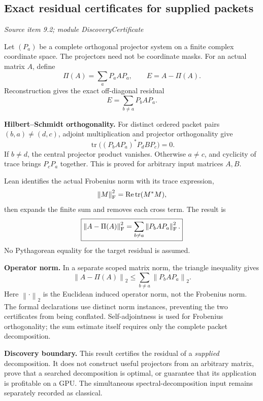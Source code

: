 \documentclass[11pt,letterpaper]{article}
\theoremstyle{definition}
\theoremstyle{remark}
\newcommand{\norm}[1]{\left\lVert#1\right\rVert}\newcommand{\abs}[1]{\left\lvert#1\right\rvert}
\begin{document}
\subsection{Exact residual certificates for supplied packets}\label{supp5:subsection:005}\textit{Source item 9.2; module DiscoveryCertificate}\par
Let $(P_a)$ be a complete orthogonal projector system on a finite complex coordinate space. The projectors need not be coordinate masks. For an actual matrix $A$, define
\[
\Pi(A)=\sum_aP_aAP_a,
\qquad E=A-\Pi(A).
\]
Reconstruction gives the exact off-diagonal residual
\[
E=\sum_{b\ne a}P_bAP_a.
\]

\textbf{Hilbert--Schmidt orthogonality.} For distinct ordered packet pairs $(b,a)\ne(d,c)$, adjoint multiplication and projector orthogonality give
\[
\operatorname{tr}\bigl((P_bAP_a)^*P_dBP_c\bigr)=0.
\]
If $b\ne d$, the central projector product vanishes. Otherwise $a\ne c$, and cyclicity of trace brings $P_cP_a$ together. This is proved for arbitrary input matrices $A,B$.

Lean identifies the actual Frobenius norm with its trace expression,
\[
\norm{M}_{\rm F}^2=\operatorname{Re}\operatorname{tr}(M^*M),
\]
then expands the finite sum and removes each cross term. The result is
\[
\boxed{\norm{A-\Pi(A)}_{\rm F}^2
=\sum_{b\ne a}\norm{P_bAP_a}_{\rm F}^2.}
\]
No Pythagorean equality for the target residual is assumed.

\textbf{Operator norm.} In a separate scoped matrix norm, the triangle inequality gives
\[
\boxed{\norm{A-\Pi(A)}_2
\leq\sum_{b\ne a}\norm{P_bAP_a}_2.}
\]
Here $\norm{\cdot}_2$ is the Euclidean induced operator norm, not the Frobenius norm. The formal declarations use distinct norm instances, preventing the two certificates from being conflated. Self-adjointness is used for Frobenius orthogonality; the sum estimate itself requires only the complete packet decomposition.

\textbf{Discovery boundary.} This result certifies the residual of a \emph{supplied} decomposition. It does not construct useful projectors from an arbitrary matrix, prove that a searched decomposition is optimal, or guarantee that its application is profitable on a GPU. The simultaneous spectral-decomposition input remains separately recorded as classical.
\end{document}
